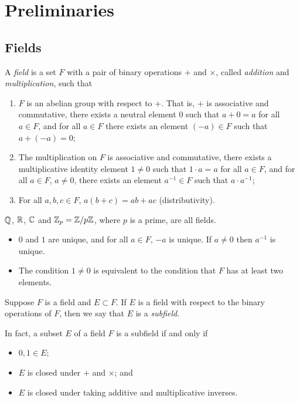 \section{Preliminaries}
\subsection{Fields}
\begin{definition}
	A \emph{field} is a set $F$ with a pair of binary operations $+$ and $\times$, called \emph{addition} and \emph{multiplication}, such that
	\begin{enumerate}
		\item $F$ is an abelian group with respect to $+$. That is, $+$ is associative and commutative, there exists a neutral element $0$ such that $a + 0 = a$ for all $a \in F$, and for all $a \in F$ there exists an element $(-a) \in F$ such that $a + (-a) = 0$;
		\item The multiplication on $F$ is associative and commutative, there exists a multiplicative identity element $1 \neq 0$ such that $1 \cdot a = a$ for all $a \in F$, and for all $a \in F$, $a \neq 0$, there exists an element $a^{-1} \in F$ such that $a \cdot a^{-1}$;
		\item For all $a, b, c \in F$, $a(b + c) = ab + ac$ (distributivity).
	\end{enumerate}
\end{definition}

\begin{example}
	$\mathbb{Q}$, $\mathbb{R}$, $\mathbb{C}$ and $\mathbb{Z}_p = \mathbb{Z} / p\mathbb{Z}$, where $p$ is a prime, are all fields.
\end{example}

\begin{remarks} \hfill
	\begin{itemize}
		\item $0$ and $1$ are unique, and for all $a \in F$, $-a$ is unique. If $a \neq 0$ then $a^{-1}$ is unique.
		\item The condition $1 \neq 0$ is equivalent to the condition that $F$ has at least two elements.
	\end{itemize}
\end{remarks}

\begin{definition}
	Suppose $F$ is a field and $E \subset F$. If $E$ is a field with respect to the binary operations of $F$, then we say that $E$ is a \emph{subfield}.
	
	In fact, a subset $E$ of a field $F$ is a subfield if and only if
	\begin{itemize}
		\item $0, 1 \in E$;
		\item $E$ is closed under $+$ and $\times$; and
		\item $E$ is closed under taking additive and multiplicative inverses.
	\end{itemize}
\end{definition}
